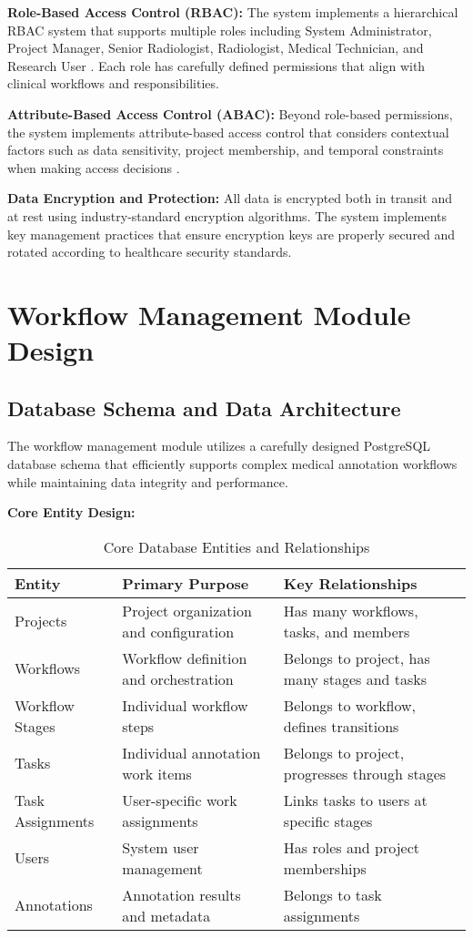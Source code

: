 \textbf{Role-Based Access Control (RBAC):} The system implements a hierarchical RBAC system that supports multiple roles including System Administrator, Project Manager, Senior Radiologist, Radiologist, Medical Technician, and Research User \cite{sandhu1996role}. Each role has carefully defined permissions that align with clinical workflows and responsibilities.

\textbf{Attribute-Based Access Control (ABAC):} Beyond role-based permissions, the system implements attribute-based access control that considers contextual factors such as data sensitivity, project membership, and temporal constraints when making access decisions \cite{hu2014guide}.

\textbf{Data Encryption and Protection:} All data is encrypted both in transit and at rest using industry-standard encryption algorithms. The system implements key management practices that ensure encryption keys are properly secured and rotated according to healthcare security standards.

\section{Workflow Management Module Design}

\subsection{Database Schema and Data Architecture}

The workflow management module utilizes a carefully designed PostgreSQL database schema that efficiently supports complex medical annotation workflows while maintaining data integrity and performance.

\textbf{Core Entity Design:}

\begin{table}[htbp]
\centering
\caption{Core Database Entities and Relationships}
\label{tab:database-entities}
\begin{tabular}{|p{3cm}|p{4cm}|p{7cm}|}
\hline
\textbf{Entity} & \textbf{Primary Purpose} & \textbf{Key Relationships} \\
\hline
Projects & Project organization and configuration & Has many workflows, tasks, and members \\
\hline
Workflows & Workflow definition and orchestration & Belongs to project, has many stages and tasks \\
\hline
Workflow Stages & Individual workflow steps & Belongs to workflow, defines transitions \\
\hline
Tasks & Individual annotation work items & Belongs to project, progresses through stages \\
\hline
Task Assignments & User-specific work assignments & Links tasks to users at specific stages \\
\hline
Users & System user management & Has roles and project memberships \\
\hline
Annotations & Annotation results and metadata & Belongs to task assignments \\
\hline
\end{tabular}
\end{table}

